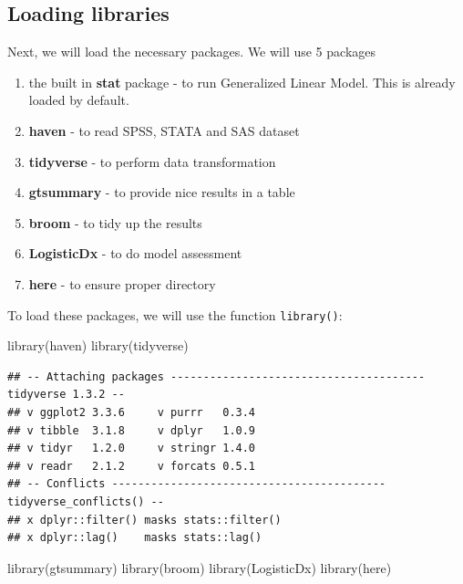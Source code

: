 \documentclass[
  10pt,
]{krantz}
\newenvironment{Shaded}{\begin{snugshade}}{\end{snugshade}}
\newcommand{\FunctionTok}[1]{\textcolor[rgb]{0.00,0.00,0.00}{#1}}
\newcommand{\NormalTok}[1]{#1}
\providecommand{\tightlist}{%
  \setlength{\itemsep}{0pt}\setlength{\parskip}{0pt}}
\begin{document}
\hypertarget{loading-libraries}{%
\subsection{Loading libraries}\label{loading-libraries}}

Next, we will load the necessary packages. We will use 5 packages

\begin{enumerate}
\def\labelenumi{\arabic{enumi}.}
\tightlist
\item
  the built in \textbf{stat} package - to run Generalized Linear Model. This is already loaded by default.
\item
  \textbf{haven} - to read SPSS, STATA and SAS dataset
\item
  \textbf{tidyverse} - to perform data transformation
\item
  \textbf{gtsummary} - to provide nice results in a table\\
\item
  \textbf{broom} - to tidy up the results
\item
  \textbf{LogisticDx} - to do model assessment
\item
  \textbf{here} - to ensure proper directory
\end{enumerate}

To load these packages, we will use the function \texttt{library()}:

\begin{Shaded}
\begin{Highlighting}[]
\FunctionTok{library}\NormalTok{(haven)}
\FunctionTok{library}\NormalTok{(tidyverse)}
\end{Highlighting}
\end{Shaded}

\begin{verbatim}
## -- Attaching packages --------------------------------------- tidyverse 1.3.2 --
## v ggplot2 3.3.6     v purrr   0.3.4
## v tibble  3.1.8     v dplyr   1.0.9
## v tidyr   1.2.0     v stringr 1.4.0
## v readr   2.1.2     v forcats 0.5.1
## -- Conflicts ------------------------------------------ tidyverse_conflicts() --
## x dplyr::filter() masks stats::filter()
## x dplyr::lag()    masks stats::lag()
\end{verbatim}

\begin{Shaded}
\begin{Highlighting}[]
\FunctionTok{library}\NormalTok{(gtsummary)}
\FunctionTok{library}\NormalTok{(broom)}
\FunctionTok{library}\NormalTok{(LogisticDx)}
\FunctionTok{library}\NormalTok{(here)}
\end{Highlighting}
\end{Shaded}
\end{document}
